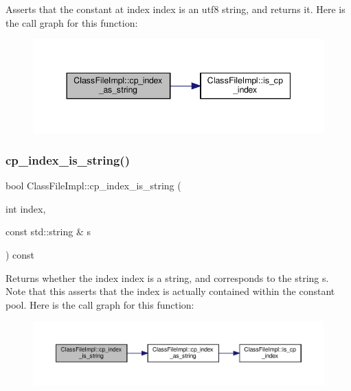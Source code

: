 Asserts that the constant at index {\ttfamily index} is an utf8 string, and returns it. Here is the call graph for this function\+:
\nopagebreak
\begin{figure}[H]
\begin{center}
\leavevmode
\includegraphics[width=344pt]{classClassFileImpl_abf8923075c93d6d5bd1755a7b3ced362_cgraph}
\end{center}
\end{figure}
\mbox{\label{classClassFileImpl_ab84cd50d25d163274a299ba682f57610}} 
\subsubsection{\texorpdfstring{cp\+\_\+index\+\_\+is\+\_\+string()}{cp\_index\_is\_string()}}
{\footnotesize\ttfamily bool Class\+File\+Impl\+::cp\+\_\+index\+\_\+is\+\_\+string (\begin{DoxyParamCaption}\item[{int}]{index,  }\item[{const std\+::string \&}]{s }\end{DoxyParamCaption}) const}

Returns whether the index {\ttfamily index} is a string, and corresponds to the string {\ttfamily s}. Note that this asserts that the index is actually contained within the constant pool. Here is the call graph for this function\+:
\nopagebreak
\begin{figure}[H]
\begin{center}
\leavevmode
\includegraphics[width=350pt]{classClassFileImpl_ab84cd50d25d163274a299ba682f57610_cgraph}
\end{center}
\end{figure}
\mbox{\label{classClassFileImpl_abdfa46cef80b0ec30115f1c0c9bb1db6}} 
